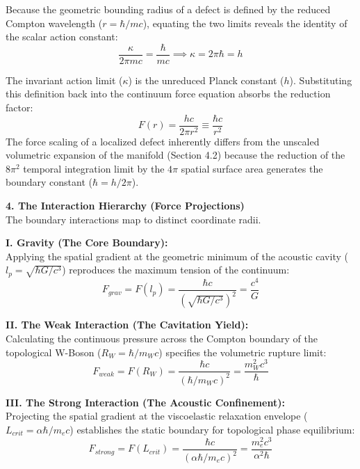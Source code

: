 Because the geometric bounding radius of a defect is defined by the reduced Compton wavelength ($r = \hbar/mc$), equating the two limits reveals the identity of the scalar action constant: 
\begin{equation}
    \frac{\kappa}{2\pi mc} = \frac{\hbar}{mc} \implies \kappa = 2\pi \hbar = h
\end{equation}

The invariant action limit ($\kappa$) is the unreduced Planck constant ($h$). Substituting this definition back into the continuum force equation absorbs the reduction factor:
\begin{equation}
    F(r) = \frac{hc}{2\pi r^2} \equiv \frac{\hbar c}{r^2} \label{eq:fundamental_force_limit}
\end{equation}
The force scaling of a localized defect inherently differs from the unscaled volumetric expansion of the manifold (Section 4.2) because the reduction of the $8\pi^2$ temporal integration limit by the $4\pi$ spatial surface area generates the boundary constant ($\hbar = h/2\pi$).

\vspace{0.2 cm}

\textbf{4. The Interaction Hierarchy (Force Projections)} \\
The boundary interactions map to distinct coordinate radii.

\textbf{I. Gravity (The Core Boundary):} \\
Applying the spatial gradient at the geometric minimum of the acoustic cavity ($l_p = \sqrt{\hbar G / c^3}$) reproduces the maximum tension of the continuum: 
\begin{equation}
    F_{grav} = F(l_p) = \frac{\hbar c}{(\sqrt{\hbar G / c^3})^2} = \frac{c^4}{G}
\end{equation}

\textbf{II. The Weak Interaction (The Cavitation Yield):} \\
Calculating the continuous pressure across the Compton boundary of the topological W-Boson ($R_W = \hbar / m_W c$) specifies the volumetric rupture limit: 
\begin{equation}
    F_{weak} = F(R_W) = \frac{\hbar c}{(\hbar / m_W c)^2} = \frac{m_W^2 c^3}{\hbar}
\end{equation}

\textbf{III. The Strong Interaction (The Acoustic Confinement):} \\
Projecting the spatial gradient at the viscoelastic relaxation envelope ($L_{crit} = \alpha \hbar / m_e c$) establishes the static boundary for topological phase equilibrium: 
\begin{equation}
    F_{strong} = F(L_{crit}) = \frac{\hbar c}{(\alpha \hbar / m_e c)^2} = \frac{m_e^2 c^3}{\alpha^2 \hbar}
\end{equation}

